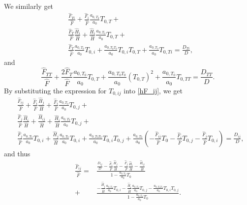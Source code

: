 \documentclass[internal,english]{sintefmemo2012}
\newcommand*{\hF}[0]{\hat F}
\newcommand*{\hH}[0]{\hat H}
\newcommand{\lp}{\left(}
\newcommand{\rp}{\right)}
\numberwithin{equation}{section}
\begin{document}
We similarly get
\begin{equation}
  \label{hF_Ti}
  \begin{aligned}
    &\frac{\hF_{Ti}}{\hF} + \frac{\hF_i}{\hF}\frac{a_{0,T_0}}{a_0} T_{0,T} + \\
    &\frac{\hF_{T}}{\hF} \frac{\hH_i}{\hH} + \frac{\hH_i}{\hH}\frac{a_{0,T_0}}{a_0} T_{0,T} + \\
    &\frac{\hF_T}{\hF}\frac{a_{0,T_0}}{a_0} T_{0,i} +
    \frac{a_{0,T_0T_0}}{a_0} T_{0,i} T_{0,T} + \frac{a_{0,T_0}}{a_0}
    T_{0,Ti} = \frac{D_{Ti}}{D},
  \end{aligned}
\end{equation}
and
\begin{equation}
  \label{hF_TT}
  \frac{\hF_{TT}}{\hF} + \frac{2\hF_T}{\hF}\frac{a_{0,T_0}}{a_0} T_{0,T} + \frac{a_{0,T_0T_0}}{a_0} (T_{0,T})^2 + \frac{a_{0,T_0}}{a_0} T_{0,TT} = \frac{D_{TT}}{D}.
\end{equation}
By substituting the expression for $T_{0,ij}$ into \eqref{hF_ij}, we
get
\begin{align*}
  &\frac{\hF_{ij}}{\hF} + \frac{\hF_i}{\hF}\frac{\hH_j}{\hH} + \frac{\hF_i}{\hF}\frac{a_{0,T_0}}{a_0} T_{0,j} + \\
  &\frac{\hF_{j}}{\hF} \frac{\hH_i}{\hH} + \frac{\hH_{ij}}{\hH} + \frac{\hH_i}{\hH}\frac{a_{0,T_0}}{a_0} T_{0,j} + \\
  &\frac{\hF_j}{\hF}\frac{a_{0,T_0}}{a_0} T_{0,i} +
  \frac{\hH_j}{\hH}\frac{a_{0,T_0}}{a_0} T_{0,i} +
  \frac{a_{0,T_0T_0}}{a_0} T_{0,i} T_{0,j} + \frac{a_{0,T_0}}{a_0} \lp
  -\frac{\hF_{ij}}{\hF} T_0 - \frac{\hF_i}{\hF} T_{0,j} -
  \frac{\hF_j}{\hF} T_{0,i} \rp = \frac{D_{ij}}{D},
\end{align*}
and thus
\begin{equation}
  \begin{aligned}
    \frac{\hF_{ij}}{\hF} =& \frac{ \frac{D_{ij}}{D} - \frac{\hF_i}{\hF}\frac{\hH_j}{\hH} - \frac{\hF_{j}}{\hF} \frac{\hH_i}{\hH} - \frac{\hH_{ij}}{\hH} }{1-\frac{a_{0,T_0}}{a_0} T_0} \\
    +& \frac{-\frac{\hH_j}{\hH}\frac{a_{0,T_0}}{a_0} T_{0,i} -
      \frac{\hH_i}{\hH}\frac{a_{0,T_0}}{a_0} T_{0,j} -
      \frac{a_{0,T_0T_0}}{a_0} T_{0,i}
      T_{0,j}}{1-\frac{a_{0,T_0}}{a_0} T_0}.
  \end{aligned}
\end{equation}
\end{document}

